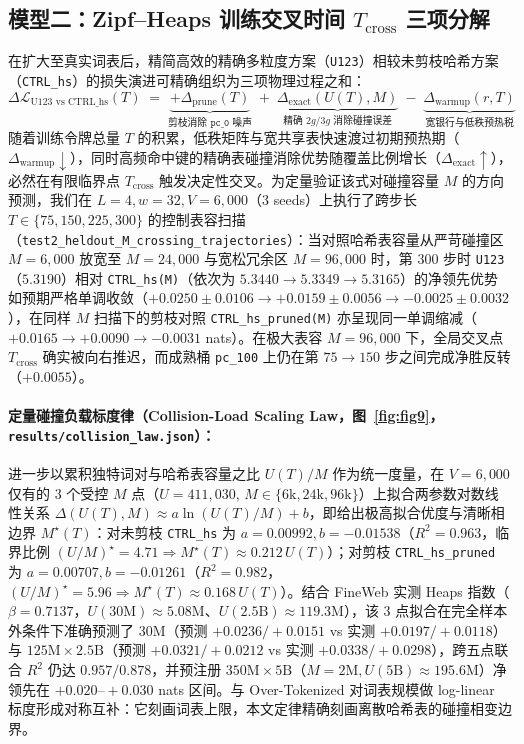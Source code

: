 \documentclass[10.5pt,a4paper]{ctexart}
\begin{document}
\subsection{模型二：Zipf--Heaps 训练交叉时间 \texorpdfstring{$T_{\text{cross}}$}{T\_cross} 三项分解}
在扩大至真实词表后，精简高效的精确多粒度方案（\texttt{U123}）相较未剪枝哈希方案（\texttt{CTRL\_hs}）的损失演进可精确组织为三项物理过程之和：
\begin{equation}
\Delta \mathcal{L}_{\text{U123 vs CTRL\_hs}}(T) \;=\; \underbrace{+\Delta_{\text{prune}}(T)}_{\text{剪枝消除 }\texttt{pc\_0}\text{ 噪声}} \;+\; \underbrace{\Delta_{\text{exact}}(U(T), M)}_{\text{精确 }2g/3g\text{ 消除碰撞误差}} \;-\; \underbrace{\Delta_{\text{warmup}}(r, T)}_{\text{宽银行与低秩预热税}}
\end{equation}
随着训练令牌总量 $T$ 的积累，低秩矩阵与宽共享表快速渡过初期预热期（$\Delta_{\text{warmup}} \downarrow$），同时高频命中键的精确表碰撞消除优势随覆盖比例增长（$\Delta_{\text{exact}} \uparrow$），必然在有限临界点 $T_{\text{cross}}$ 触发决定性交叉。为定量验证该式对碰撞容量 $M$ 的方向预测，我们在 $L=4, w=32, V=6{,}000$（3 seeds）上执行了跨步长 $T \in \{75, 150, 225, 300\}$ 的控制表容扫描（\texttt{test2\_heldout\_M\_crossing\_trajectories}）：当对照哈希表容量从严苛碰撞区 $M=6{,}000$ 放宽至 $M=24{,}000$ 与宽松冗余区 $M=96{,}000$ 时，第 300 步时 \texttt{U123}（$5.3190$）相对 \texttt{CTRL\_hs(M)}（依次为 $5.3440 \to 5.3349 \to 5.3165$）的净领先优势如预期严格单调收敛（\textbf{$+0.0250 \pm 0.0106 \to +0.0159 \pm 0.0056 \to -0.0025 \pm 0.0032$}），在同样 $M$ 扫描下的剪枝对照 \texttt{CTRL\_hs\_pruned(M)} 亦呈现同一单调缩减（\textbf{$+0.0165 \to +0.0090 \to -0.0031$} nats）。在极大表容 $M=96{,}000$ 下，全局交叉点 $T_{\text{cross}}$ 确实被向右推迟，而成熟桶 \texttt{pc\_100} 上仍在第 $75\to 150$ 步之间完成净胜反转（$+0.0055$）。

\paragraph{定量碰撞负载标度律（Collision-Load Scaling Law，图~\ref{fig:fig9}，\texttt{results/collision\_law.json}）：} 进一步以累积独特词对与哈希表容量之比 $U(T)/M$ 作为统一度量，在 $V=6{,}000$ 仅有的 3 个受控 $M$ 点（$U=411{,}030, \, M \in \{6\text{k}, 24\text{k}, 96\text{k}\}$）上拟合两参数对数线性关系 $\Delta(U(T), M) \approx a \ln(U(T)/M) + b$，即给出极高拟合优度与清晰相边界 $M^\star(T)$：对未剪枝 \texttt{CTRL\_hs} 为 $a=0.00992, b=-0.01538$（\textbf{$R^2=0.963$}，临界比例 $(U/M)^\star=4.71 \Rightarrow M^\star(T)\approx 0.212\,U(T)$）；对剪枝 \texttt{CTRL\_hs\_pruned} 为 $a=0.00707, b=-0.01261$（\textbf{$R^2=0.982$}，$(U/M)^\star=5.96 \Rightarrow M^\star(T)\approx 0.168\,U(T)$）。结合 FineWeb 实测 Heaps 指数（$\beta=0.7137$，$U(30\text{M})\approx 5.08\text{M}$、$U(2.5\text{B})\approx 119.3\text{M}$），该 3 点拟合在完全样本外条件下准确预测了 $30\text{M}$（预测 $+0.0236 / +0.0151$ vs 实测 $+0.0197 / +0.0118$）与 $125\text{M}\times 2.5\text{B}$（预测 $+0.0321 / +0.0212$ vs 实测 $+0.0338 / +0.0298$），跨五点联合 $R^2$ 仍达 $0.957 / 0.878$，并预注册 $350\text{M}\times 5\text{B}$（$M=2\text{M}, U(5\text{B})\approx 195.6\text{M}$）净领先在 $+0.020\text{--}+0.030$ nats 区间。与 Over-Tokenized 对词表规模做 log-linear 标度形成对称互补：它刻画词表上限，本文定律精确刻画离散哈希表的碰撞相变边界。
\end{document}
